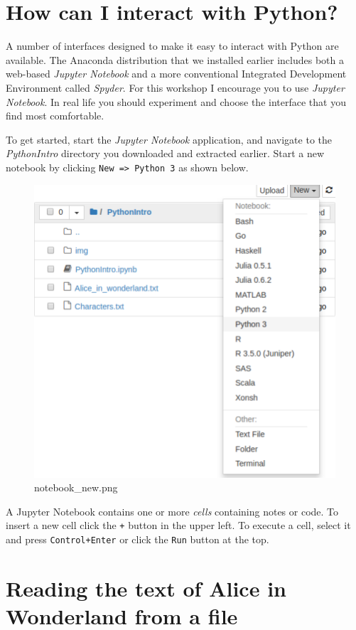 \documentclass[]{book}
\begin{document}
\section{How can I interact with
Python?}\label{how-can-i-interact-with-python}

A number of interfaces designed to make it easy to interact with Python
are available. The Anaconda distribution that we installed earlier
includes both a web-based \emph{Jupyter Notebook} and a more
conventional Integrated Development Environment called \emph{Spyder}.
For this workshop I encourage you to use \emph{Jupyter Notebook}. In
real life you should experiment and choose the interface that you find
most comfortable.

To get started, start the \emph{Jupyter Notebook} application, and
navigate to the \emph{PythonIntro} directory you downloaded and
extracted earlier. Start a new notebook by clicking
\texttt{New\ =\textgreater{}\ Python\ 3} as shown below.

\begin{figure}
\centering
\includegraphics{Python/PythonIntro/images/notebook_new.png}
\caption{notebook\_new.png}
\end{figure}

A Jupyter Notebook contains one or more \emph{cells} containing notes or
code. To insert a new cell click the \texttt{+} button in the upper
left. To execute a cell, select it and press \texttt{Control+Enter} or
click the \texttt{Run} button at the top.

\section{Reading the text of Alice in Wonderland from a
file}\label{reading-the-text-of-alice-in-wonderland-from-a-file}
\end{document}
